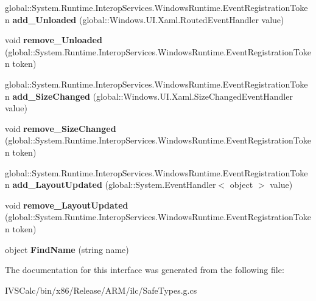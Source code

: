 \begin{DoxyCompactItemize}
\item 
\mbox{\label{interface_windows_1_1_u_i_1_1_xaml_1_1_i_framework_element_ad4ed2f244c6516761d641431768f021b}} 
global\+::\+System.\+Runtime.\+Interop\+Services.\+Windows\+Runtime.\+Event\+Registration\+Token {\bfseries add\+\_\+\+Unloaded} (global\+::\+Windows.\+U\+I.\+Xaml.\+Routed\+Event\+Handler value)
\item 
\mbox{\label{interface_windows_1_1_u_i_1_1_xaml_1_1_i_framework_element_a3289e30bb0249071801645260d266744}} 
void {\bfseries remove\+\_\+\+Unloaded} (global\+::\+System.\+Runtime.\+Interop\+Services.\+Windows\+Runtime.\+Event\+Registration\+Token token)
\item 
\mbox{\label{interface_windows_1_1_u_i_1_1_xaml_1_1_i_framework_element_abf3ac37a9daffc43b7299c8aa7b02e4a}} 
global\+::\+System.\+Runtime.\+Interop\+Services.\+Windows\+Runtime.\+Event\+Registration\+Token {\bfseries add\+\_\+\+Size\+Changed} (global\+::\+Windows.\+U\+I.\+Xaml.\+Size\+Changed\+Event\+Handler value)
\item 
\mbox{\label{interface_windows_1_1_u_i_1_1_xaml_1_1_i_framework_element_aee2c3dbe7e3702a98c8bff9f0c4720c0}} 
void {\bfseries remove\+\_\+\+Size\+Changed} (global\+::\+System.\+Runtime.\+Interop\+Services.\+Windows\+Runtime.\+Event\+Registration\+Token token)
\item 
\mbox{\label{interface_windows_1_1_u_i_1_1_xaml_1_1_i_framework_element_a25ade46d3420c73f6b9ca99a333bf905}} 
global\+::\+System.\+Runtime.\+Interop\+Services.\+Windows\+Runtime.\+Event\+Registration\+Token {\bfseries add\+\_\+\+Layout\+Updated} (global\+::\+System.\+Event\+Handler$<$ object $>$ value)
\item 
\mbox{\label{interface_windows_1_1_u_i_1_1_xaml_1_1_i_framework_element_ac054df7c36430442d26d3ce119295117}} 
void {\bfseries remove\+\_\+\+Layout\+Updated} (global\+::\+System.\+Runtime.\+Interop\+Services.\+Windows\+Runtime.\+Event\+Registration\+Token token)
\item 
\mbox{\label{interface_windows_1_1_u_i_1_1_xaml_1_1_i_framework_element_a07a0149f2dee5784c52807f935eb41d9}} 
object {\bfseries Find\+Name} (string name)
\end{DoxyCompactItemize}


The documentation for this interface was generated from the following file\+:\begin{DoxyCompactItemize}
\item 
I\+V\+S\+Calc/bin/x86/\+Release/\+A\+R\+M/ilc/Safe\+Types.\+g.\+cs\end{DoxyCompactItemize}

